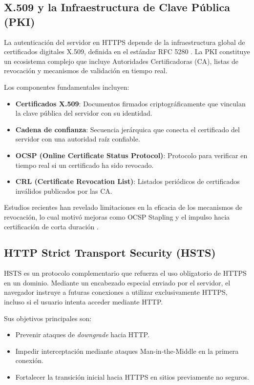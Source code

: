 \subsection{X.509 y la Infraestructura de Clave Pública (PKI)}

La autenticación del servidor en HTTPS depende de la infraestructura global de certificados digitales X.509, definida en el estándar RFC 5280 \cite{rfc5280}. La PKI constituye un ecosistema complejo que incluye Autoridades Certificadoras (CA), listas de revocación y mecanismos de validación en tiempo real.

Los componentes fundamentales incluyen:

\begin{itemize}
    \item \textbf{Certificados X.509}: Documentos firmados criptográficamente que vinculan la clave pública del servidor con su identidad.
    \item \textbf{Cadena de confianza}: Secuencia jerárquica que conecta el certificado del servidor con una autoridad raíz confiable.
    \item \textbf{OCSP (Online Certificate Status Protocol)}: Protocolo para verificar en tiempo real si un certificado ha sido revocado.
    \item \textbf{CRL (Certificate Revocation List)}: Listados periódicos de certificados inválidos publicados por las CA.
\end{itemize}

Estudios recientes han revelado limitaciones en la eficacia de los mecanismos de revocación, lo cual motivó mejoras como OCSP Stapling y el impulso hacia certificación de corta duración \cite{liu2015, helme2024}.

\subsection{HTTP Strict Transport Security (HSTS)}

HSTS es un protocolo complementario que refuerza el uso obligatorio de HTTPS en un dominio. Mediante un encabezado especial enviado por el servidor, el navegador instruye a futuras conexiones a utilizar exclusivamente HTTPS, incluso si el usuario intenta acceder mediante HTTP.

Sus objetivos principales son:

\begin{itemize}
    \item Prevenir ataques de \textit{downgrade} hacia HTTP.
    \item Impedir interceptación mediante ataques Man-in-the-Middle en la primera conexión.
    \item Fortalecer la transición inicial hacia HTTPS en sitios previamente no seguros.
\end{itemize}

